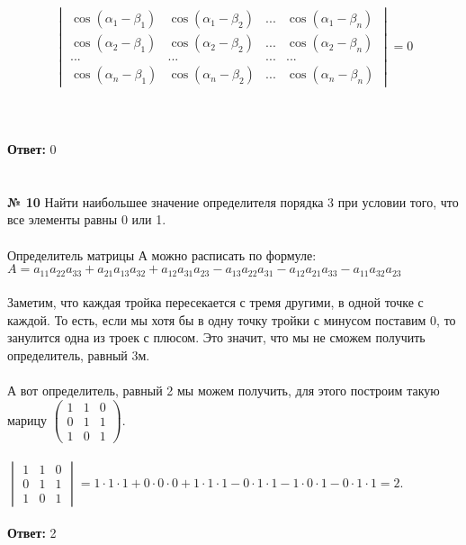 \documentclass[a4paper, 12pt]{article}
\begin{document}
    \[
        \begin{vmatrix}\cos (\alpha_1 - \beta_1) & \cos (\alpha_1 - \beta_2) & ... & \cos (\alpha_1 - \beta_n) \\ \cos (\alpha_2 - \beta_1) & \cos (\alpha_2 - \beta_2) & ... & \cos (\alpha_2 - \beta_n) \\ ... & ... & ... & ... \\ \cos (\alpha_n - \beta_1) & \cos (\alpha_n - \beta_2) & ... & \cos (\alpha_n - \beta_n)\end{vmatrix} = 0
    \]
    \\
    \\
    \\ \textbf{Ответ:} 0
    \\
    \\
    \\ \textbf{№ 10} Найти наибольшее значение определителя порядка 3 при условии того, что все элементы равны 0 или 1.
    \\
    \\ Определитель матрицы А можно расписать по формуле:
    \\ $A = a_{11}a_{22}a_{33} + a_{21}a_{13}a_{32} + a_{12}a_{31}a_{23} - a_{13}a_{22}a_{31} - a_{12}a_{21}a_{33} - a_{11}a_{32}a_{23}$
    \\
    \\ Заметим, что каждая тройка пересекается с тремя другими, в одной точке с каждой. То есть, если мы хотя бы в одну точку тройки с минусом поставим 0, то занулится одна из троек с плюсом. Это значит, что мы не сможем получить определитель, равный 3м.
    \\
    \\ А вот определитель, равный 2 мы можем получить, для этого построим такую марицу $\begin{pmatrix}1 & 1 & 0 \\ 0 & 1 & 1 \\ 1 & 0 & 1\end{pmatrix}$.
    \\
    \\ $\begin{vmatrix}1 & 1 & 0 \\ 0 & 1 & 1 \\ 1 & 0 & 1\end{vmatrix} = 1 \cdot 1 \cdot 1 + 0 \cdot 0 \cdot 0 + 1 \cdot 1 \cdot 1 - 0 \cdot 1 \cdot 1 - 1 \cdot 0 \cdot 1 - 0 \cdot 1 \cdot 1 = 2$.
    \\
    \\ \textbf{Ответ: } 2
\end{document}

